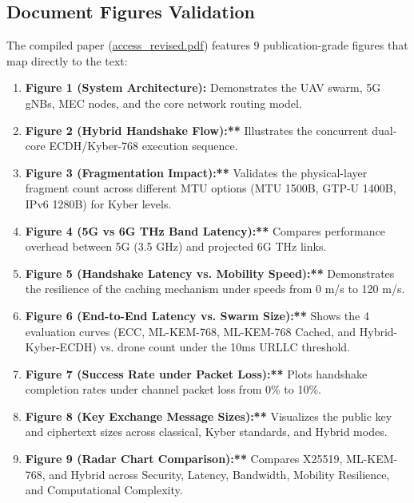 \documentclass[11pt,a4paper]{article}
\begin{document}
\subsection{Document Figures Validation}
The compiled paper (\href{file:///c:/wsl.localhost/Ubuntu-22.04/home/abishek14/Kyber-6G project/IEEE_Access_LaTeX_template__1_dup/access_revised.pdf}{access\_revised.pdf}) features 9 publication-grade figures that map directly to the text:
\begin{enumerate}
    \item \textbf{Figure 1 (System Architecture):} Demonstrates the UAV swarm, 5G gNBs, MEC nodes, and the core network routing model.
    \item \textbf{Figure 2 (Hybrid Handshake Flow):**} Illustrates the concurrent dual-core ECDH/Kyber-768 execution sequence.
    \item \textbf{Figure 3 (Fragmentation Impact):**} Validates the physical-layer fragment count across different MTU options (MTU 1500B, GTP-U 1400B, IPv6 1280B) for Kyber levels.
    \item \textbf{Figure 4 (5G vs 6G THz Band Latency):**} Compares performance overhead between 5G (3.5 GHz) and projected 6G THz links.
    \item \textbf{Figure 5 (Handshake Latency vs. Mobility Speed):**} Demonstrates the resilience of the caching mechanism under speeds from 0 m/s to 120 m/s.
    \item \textbf{Figure 6 (End-to-End Latency vs. Swarm Size):**} Shows the 4 evaluation curves (ECC, ML-KEM-768, ML-KEM-768 Cached, and Hybrid-Kyber-ECDH) vs. drone count under the 10ms URLLC threshold.
    \item \textbf{Figure 7 (Success Rate under Packet Loss):**} Plots handshake completion rates under channel packet loss from 0\% to 10\%.
    \item \textbf{Figure 8 (Key Exchange Message Sizes):**} Visualizes the public key and ciphertext sizes across classical, Kyber standards, and Hybrid modes.
    \item \textbf{Figure 9 (Radar Chart Comparison):**} Compares X25519, ML-KEM-768, and Hybrid across Security, Latency, Bandwidth, Mobility Resilience, and Computational Complexity.
\end{enumerate}
\end{document}
